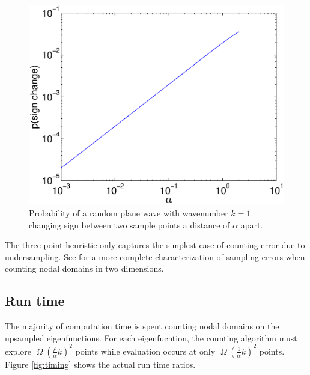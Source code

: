\documentclass{report}
\begin{document}
\begin{figure}
  \begin{center}
  \includegraphics[width=\textwidth]{figs/interpolation/analytic_connectivity_error_prob.eps}
  \caption{Probability of a random plane wave with wavenumber $k = 1$ changing sign between two sample points a distance of $\alpha$ apart.}
  \label{fig:connectivity_error_prob}
  \end{center}
\end{figure}

The three-point heuristic only captures the simplest case of counting error due to undersampling. See \cite{mischaikow} for a more complete characterization of sampling errors when counting nodal domains in two dimensions.

\subsection{Run time}
The majority of computation time is spent counting nodal domains on the upsampled eigenfunctions. For each eigenfucntion, the counting algorithm must explore $\vert \Omega \vert \left( \frac{\rho}{\alpha} k \right)^{2}$ points while evaluation occurs at only $\vert \Omega \vert \left( \frac{1}{\alpha} k \right)^{2}$ points. Figure \ref{fig:timing} shows the actual run time ratios.
\end{document}
